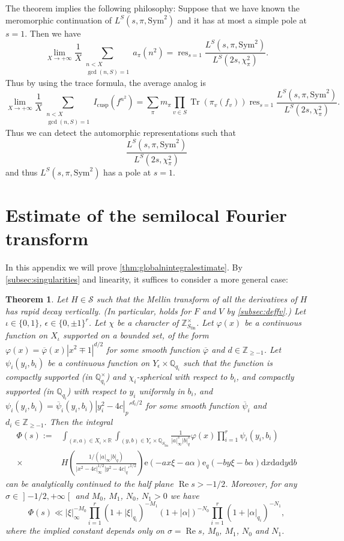 \documentclass[10pt,oneside,reqno]{amsart}
\newcommand\lopen{\mathopen{]}}
\newcommand\ropen{\mathclose{[}}
\newcommand\rmd{\mathrm{d}}
\newcommand\rme{\mathrm{e}}
\newcommand\cS{\mathcal{S}}
\newcommand\QQ{\mathbb{Q}}
\newcommand\RR{\mathbb{R}}
\newcommand\ZZ{\mathbb{Z}}
\renewcommand\Re{\mathop{\mathrm{Re}}}
\DeclareMathOperator\Tr{Tr}
\DeclareMathOperator\res{res}
\newcommand\fin{\mathrm{fin}}
\newcommand\cusp{\mathrm{cusp}}
\newcommand\Sym{\mathrm{Sym}}
\renewcommand\geq{\geqslant}
\newcommand\legendresymbol[2]{\genfrac{(}{)}{}{}{#1}{#2}}
\theoremstyle{THEOREM}
\newtheorem{theorem}{Theorem}[section]
\theoremstyle{DEFINITION}
\theoremstyle{EXERCISE}
\numberwithin{equation}{section}
\begin{document}
The theorem implies the following philosophy: Suppose that we have known the meromorphic continuation of $L^S(s,\pi,\Sym^2)$ and it has at most a simple pole at $s=1$. Then we have
\[
\lim_{X\to +\infty}\frac{1}{X}\sum_{\substack{n<X\\\gcd(n,S)=1}}a_\pi(n^2)= \res_{s=1}\frac{L^S(s,\pi,\Sym^2)}{L^S(2s,\chi_\pi^2)}.
\]
Thus by using the trace formula, the average analog is
\[
\lim_{X\to +\infty}\frac{1}{X}\sum_{\substack{n<X\\\gcd(n,S)=1}}I_\cusp(f^{n^2})=\sum_{\pi}m_\pi \prod_{v\in S}\Tr(\pi_v(f_v))\res_{s=1}\frac{L^S(s,\pi,\Sym^2)}{L^S(2s,\chi_\pi^2)}.
\]
Thus we can detect the automorphic representations such that 
\[
\frac{L^S(s,\pi,\Sym^2)}{L^S(2s,\chi_\pi^2)}
\]
and thus $L^S(s,\pi,\Sym^2)$ has a pole at $s=1$.
\appendix

\section{Estimate of the semilocal Fourier transform}\label{sec:globalnintegralestimateproof}
In this appendix we will prove \autoref{thm:globalnintegralestimate}. By \autoref{subsec:singularities} and linearity, it suffices to consider a more general case:
\begin{theorem}\label{thm:globalnintegralestimatefinal}
Let $H\in \cS$ such that the Mellin transform of all the derivatives of $H$ has rapid decay vertically. (In particular, holds for $F$ and $V$ by \autoref{subsec:deffv}.) Let $\iota\in \{0,1\}$, $\epsilon\in \{0,\pm 1\}^r$. Let $\chi$ be a character of $\ZZ_{S_\fin}^\times$. Let $\varphi(x)$ be a continuous function on $X_\iota$ supported on a bounded set, of the form $\varphi(x)=\overline{\varphi}(x)|x^2\mp 1|^{d/2}$ for some smooth function $\overline{\varphi}$ and $d\in \ZZ_{\geq -1}$. Let $\psi_i(y_i,b_i)$ be a continuous function on $Y_\epsilon\times \QQ_{q_i}$ such that the function is compactly supported (in $\QQ_{q_i}^\times$) and $\chi_i$-spherical with respect to $b_i$, and compactly supported (in $\QQ_{q_i}$) with respect to $y_i$ uniformly in $b_i$, and $\psi_i(y_i,b_i) =\overline{\psi}_i(y_i,b_i)|y_i^2-4c|_p'^{d_i/2}$ for some smooth function $\overline{\psi}_i$ and $d_i\in \ZZ_{\geq -1}$.
Then the integral
\begin{align*}
\Phi(s):=& \int_{(x,a)\in X_\iota\times\RR}\int_{(y,b)\in Y_\epsilon\times\QQ_{S_\fin}} \frac{1}{|a|_\infty^{s}|b|_q^{s}} \varphi(x)\prod_{i=1}^{r}\psi_{i}(y_i,b_i) \\
\times&H\legendresymbol{1/(|a|_\infty|b|_q)}{|x^2-4c|_\infty^{1/2}|y^2- 4c|_q'^{1/2}}\rme(-ax\xi-a\alpha)\rme_{q}(-by\xi-b\alpha)\rmd x\rmd a\rmd y\rmd b
\end{align*}
can be analytically continued to the half plane $\Re s>-1/2$. Moreover, for any $\sigma\in\lopen -1/2,+\infty\ropen$ and $M_0$, $M_1$, $N_0$, $N_1>0$ we have
\[
\Phi(s)\ll |\xi|_\infty^{-M_0}\prod_{i=1}^{r}(1+|\xi|_{q_i})^{-M_1}(1+|\alpha|)^{-N_0} \prod_{i=1}^{r}(1+|\alpha|_{q_i})^{-N_1},
\]
where the implied constant depends only on $\sigma=\Re s$, $M_0$, $M_1$, $N_0$ and $N_1$.
\end{theorem}
\end{document}
